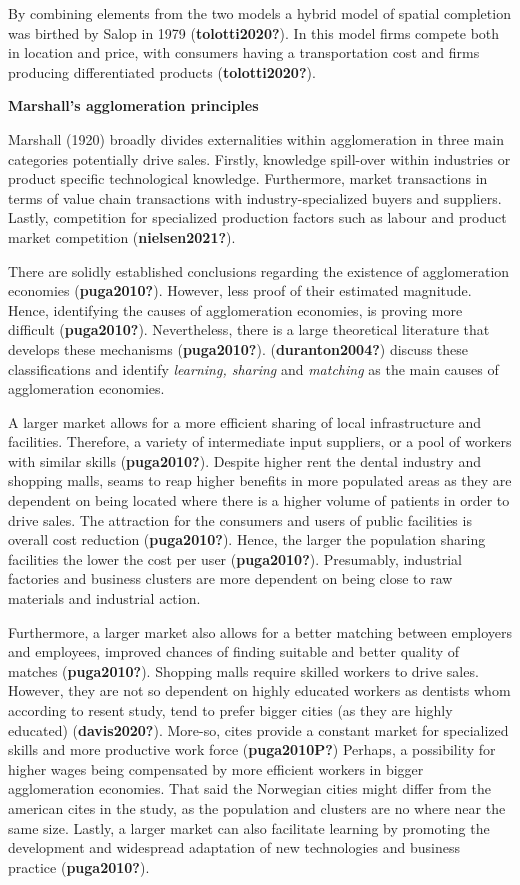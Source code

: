 \documentclass[
  10,
  a4paper,
]{article}
\begin{document}
By combining elements from the two models a hybrid model of spatial
completion was birthed by Salop in 1979 (\textbf{tolotti2020?}). In this
model firms compete both in location and price, with consumers having a
transportation cost and firms producing differentiated products
(\textbf{tolotti2020?}).

\textbf{Marshall's agglomeration principles}

Marshall (1920) broadly divides externalities within agglomeration in
three main categories potentially drive sales. Firstly, knowledge
spill-over within industries or product specific technological
knowledge. Furthermore, market transactions in terms of value chain
transactions with industry-specialized buyers and suppliers. Lastly,
competition for specialized production factors such as labour and
product market competition (\textbf{nielsen2021?}).

There are solidly established conclusions regarding the existence of
agglomeration economies (\textbf{puga2010?}). However, less proof of
their estimated magnitude. Hence, identifying the causes of
agglomeration economies, is proving more difficult (\textbf{puga2010?}).
Nevertheless, there is a large theoretical literature that develops
these mechanisms (\textbf{puga2010?}). (\textbf{duranton2004?}) discuss
these classifications and identify \emph{learning, sharing} and
\emph{matching} as the main causes of agglomeration economies.

A larger market allows for a more efficient sharing of local
infrastructure and facilities. Therefore, a variety of intermediate
input suppliers, or a pool of workers with similar skills
(\textbf{puga2010?}). Despite higher rent the dental industry and
shopping malls, seams to reap higher benefits in more populated areas as
they are dependent on being located where there is a higher volume of
patients in order to drive sales. The attraction for the consumers and
users of public facilities is overall cost reduction
(\textbf{puga2010?}). Hence, the larger the population sharing
facilities the lower the cost per user (\textbf{puga2010?}). Presumably,
industrial factories and business clusters are more dependent on being
close to raw materials and industrial action.

Furthermore, a larger market also allows for a better matching between
employers and employees, improved chances of finding suitable and better
quality of matches (\textbf{puga2010?}). Shopping malls require skilled
workers to drive sales. However, they are not so dependent on highly
educated workers as dentists whom according to resent study, tend to
prefer bigger cities (as they are highly educated)
(\textbf{davis2020?}). More-so, cites provide a constant market for
specialized skills and more productive work force (\textbf{puga2010P?})
Perhaps, a possibility for higher wages being compensated by more
efficient workers in bigger agglomeration economies. That said the
Norwegian cities might differ from the american cites in the study, as
the population and clusters are no where near the same size. Lastly, a
larger market can also facilitate learning by promoting the development
and widespread adaptation of new technologies and business practice
(\textbf{puga2010?}).
\end{document}
